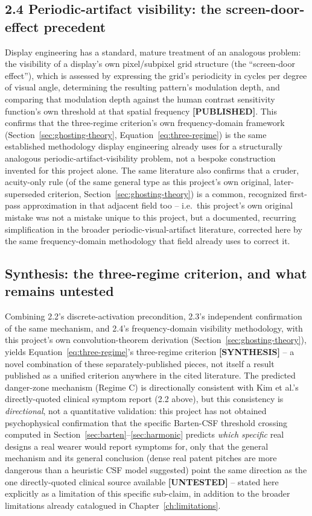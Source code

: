 \subsection{2.4 Periodic-artifact visibility: the screen-door-effect precedent}
Display engineering has a standard, mature treatment of an analogous problem: the
visibility of a display's own pixel/subpixel grid structure (the ``screen-door
effect''), which is assessed by expressing the grid's periodicity in cycles per
degree of visual angle, determining the resulting pattern's modulation depth, and
comparing that modulation depth against the human contrast sensitivity function's own
threshold at that spatial frequency \textbf{[PUBLISHED]}. This confirms that the
three-regime criterion's own frequency-domain framework
(Section~\ref{sec:ghosting-theory}, Equation~\ref{eq:three-regime}) is the same
established methodology display engineering already uses for a structurally analogous
periodic-artifact-visibility problem, not a bespoke construction invented for this
project alone. The same literature also confirms that a cruder, acuity-only rule (of
the same general type as this project's own original, later-superseded criterion,
Section~\ref{sec:ghosting-theory}) is a common, recognized first-pass approximation in
that adjacent field too -- i.e.\ this project's own original mistake was not a mistake
unique to this project, but a documented, recurring simplification in the broader
periodic-visual-artifact literature, corrected here by the same frequency-domain
methodology that field already uses to correct it.

\subsection{Synthesis: the three-regime criterion, and what remains untested}
Combining 2.2's discrete-activation precondition, 2.3's independent confirmation of the
same mechanism, and 2.4's frequency-domain visibility methodology, with this project's
own convolution-theorem derivation (Section~\ref{sec:ghosting-theory}), yields
Equation~\ref{eq:three-regime}'s three-regime criterion \textbf{[SYNTHESIS]} -- a novel
combination of these separately-published pieces, not itself a result published as a
unified criterion anywhere in the cited literature. The predicted danger-zone mechanism
(Regime C) is directionally consistent with Kim et al.'s directly-quoted clinical
symptom report (2.2 above), but this consistency is \emph{directional}, not a
quantitative validation: this project has not obtained psychophysical confirmation that
the specific Barten-CSF threshold crossing computed in
Section~\ref{sec:barten}--\ref{sec:harmonic} predicts \emph{which specific} real
designs a real wearer would report symptoms for, only that the general mechanism and
its general conclusion (dense real patent pitches are more dangerous than a
heuristic CSF model suggested) point the same direction as the one directly-quoted
clinical source available \textbf{[UNTESTED]} -- stated here explicitly as a limitation
of this specific sub-claim, in addition to the broader limitations already catalogued
in Chapter~\ref{ch:limitations}.
